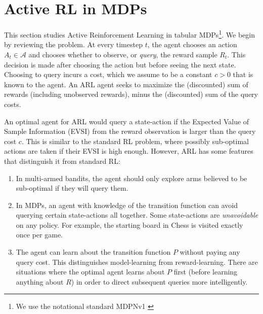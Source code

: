 \documentclass{article}
\newcommand{\A}{\mathcal{A}}
\begin{document}
\section{Active RL in MDPs}

This section studies Active Reinforcement Learning in tabular MDPs\footnote{
We use the notational standard MDPNv1 \citep{MDPNv1}
}. We begin by reviewing the problem. At every timestep $t$, the agent chooses an action $A_t \in \A$ and chooses whether to observe, or {\it query}, the reward sample $R_t$.
This decision is made after choosing the action but before seeing the next state.
Choosing to query incurs a cost, which we assume to be a constant $c>0$ that is known to the agent.
An ARL agent seeks to maximize the (discounted) sum of rewards (including unobserved rewards), minus the (discounted) sum of the query costs.



An optimal agent for ARL would query a state-action if the Expected Value of Sample Information (EVSI) \citep{EVSI} from the reward observation is larger than the query cost $c$. This is similar to the standard RL problem, where possibly sub-optimal actions are taken if their EVSI is high enough. However, ARL has some features that distinguish it from standard RL:

\begin{enumerate}
\item
In multi-armed bandits, the agent should only explore arms believed to be sub-optimal if they will query them. 
\item 
In MDPs, an agent with knowledge of the transition function can avoid querying certain state-actions all together. Some state-actions are \emph{unavoidable} on any policy. For example, the starting board in Chess is visited exactly once per game.

\item The agent can learn about the transition function $P$ without paying any query cost. This distinguishes model-learning from reward-learning. There are situations where the optimal agent learns about $P$ first (before learning anything about $R$) in order to direct subsequent queries more intelligently.
\end{enumerate}
\end{document}
